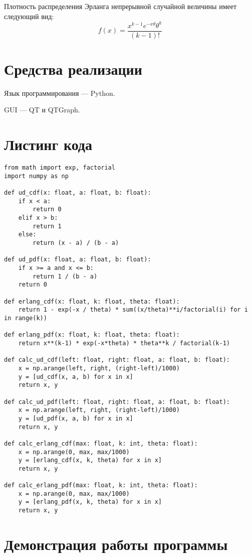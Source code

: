 Плотность распределения Эрланга непрерывной случайной величины имеет следующий вид:
\begin{equation*}
	f(x) = \frac{x^{k-1}e^{-x\theta}\theta^k}{(k-1)!}
\end{equation*}

\section*{Средства реализации}

Язык программирования --- Python.

GUI --- QT и QTGraph.

\clearpage

\section*{Листинг кода}

\begin{lstlisting}
from math import exp, factorial
import numpy as np

def ud_cdf(x: float, a: float, b: float):
	if x < a:
		return 0
	elif x > b:
		return 1
	else:
		return (x - a) / (b - a)

def ud_pdf(x: float, a: float, b: float):
	if x >= a and x <= b:
		return 1 / (b - a)
	return 0

def erlang_cdf(x: float, k: float, theta: float):
	return 1 - exp(-x / theta) * sum((x/theta)**i/factorial(i) for i in range(k))

def erlang_pdf(x: float, k: float, theta: float):
	return x**(k-1) * exp(-x*theta) * theta**k / factorial(k-1)

def calc_ud_cdf(left: float, right: float, a: float, b: float):
	x = np.arange(left, right, (right-left)/1000)
	y = [ud_cdf(x, a, b) for x in x]
	return x, y

def calc_ud_pdf(left: float, right: float, a: float, b: float):
	x = np.arange(left, right, (right-left)/1000)
	y = [ud_pdf(x, a, b) for x in x]
	return x, y

def calc_erlang_cdf(max: float, k: int, theta: float):
	x = np.arange(0, max, max/1000)
	y = [erlang_cdf(x, k, theta) for x in x]
	return x, y

def calc_erlang_pdf(max: float, k: int, theta: float):
	x = np.arange(0, max, max/1000)
	y = [erlang_pdf(x, k, theta) for x in x]
	return x, y
\end{lstlisting}

\section*{Демонстрация работы программы}

